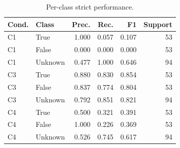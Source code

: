 \begin{table}[t]
\caption{Per-class strict performance.}
\label{tab:perclass}
\centering
\scriptsize
\setlength{\tabcolsep}{3.2pt}
\begin{tabular}{llrrrr}
\toprule
Cond. & Class & Prec. & Rec. & F1 & Support \\
\midrule
C1 & True & 1.000 & 0.057 & 0.107 & 53 \\
C1 & False & 0.000 & 0.000 & 0.000 & 53 \\
C1 & Unknown & 0.477 & 1.000 & 0.646 & 94 \\
C3 & True & 0.880 & 0.830 & 0.854 & 53 \\
C3 & False & 0.837 & 0.774 & 0.804 & 53 \\
C3 & Unknown & 0.792 & 0.851 & 0.821 & 94 \\
C4 & True & 0.500 & 0.321 & 0.391 & 53 \\
C4 & False & 1.000 & 0.226 & 0.369 & 53 \\
C4 & Unknown & 0.526 & 0.745 & 0.617 & 94 \\
\bottomrule
\end{tabular}
\end{table}
